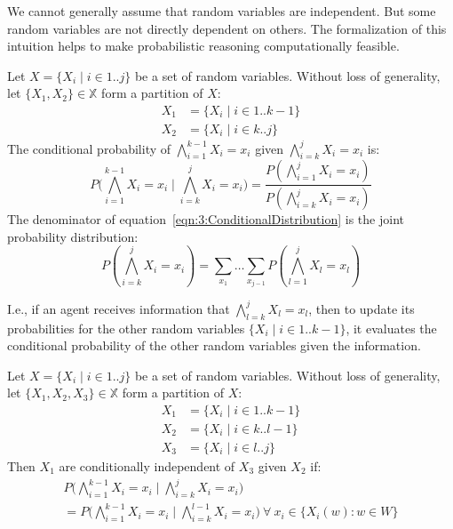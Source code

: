 We cannot generally assume that random variables are independent.
But some random variables are not directly dependent on others.
The formalization of this intuition helps to make probabilistic reasoning
computationally feasible.

\begin{dfn}
  Let $X = \{ X_i \mid i \in 1 .. j \}$ be a set of random variables.
  Without loss of generality, let $\{ X_1, X_2 \} \in \mathbb{X}$ form a
  partition of $X$:
  \begin{align*}
    X_1 & = \{ X_i \mid i \in 1 .. k - 1 \} \\
    X_2 & = \{ X_i \mid i \in k .. j \}
  \end{align*}
  The conditional probability of $\bigwedge_{i = 1}^{k - 1} X_i = x_i$
  given $\bigwedge_{i = k}^{j} X_i = x_i$ is:
  \begin{equation}
    \label{eqn:3:ConditionalDistribution}
    P \bigl( \bigwedge_{i = 1}^{k - 1} X_i = x_i \mid \bigwedge_{i = k}^{j} X_i = x_i \bigr)
    = \frac{P(\bigwedge_{i = 1}^{j} X_i = x_i)}{P(\bigwedge_{i = k}^{j} X_i = x_i)}
  \end{equation}
  The denominator of equation~\ref{eqn:3:ConditionalDistribution} is the joint
  probability distribution:
  \begin{equation}
    P(\bigwedge_{i = k}^{j} X_i = x_i)
    = \sum_{x_1} \ldots \sum_{x_{j - 1}} P(\bigwedge_{l = 1}^{j} X_l = x_l)
  \end{equation}
\end{dfn}

I.e., if an agent receives information that $\bigwedge_{l = k}^{j} X_l = x_l$,
then to update its probabilities for the other random variables
$\{ X_i \mid i \in 1 .. k - 1 \}$, it evaluates the conditional probability of
the other random variables given the information.

\begin{dfn}
  Let $X = \{ X_i \mid i \in 1 .. j \}$ be a set of random variables.
  Without loss of generality, let $\{ X_1, X_2, X_3 \} \in \mathbb{X}$ form a
  partition of $X$:
  \begin{align*}
    X_1 & = \{ X_i \mid i \in 1 .. k - 1 \} \\
    X_2 & = \{ X_i \mid i \in k .. l - 1 \} \\
    X_3 & = \{ X_i \mid i \in l .. j \}
  \end{align*}
  Then $X_1$ are conditionally independent of $X_3$ given $X_2$ if:
  \begin{multline}
    P \bigl( \bigwedge_{i = 1}^{k - 1} X_i = x_i \mid \bigwedge_{i = k}^{j} X_i = x_i \bigr) \\
    = P \bigl( \bigwedge_{i = 1}^{k - 1} X_i = x_i \mid \bigwedge_{i = k}^{l - 1} X_i = x_i \bigr)
    \ \forall\
    x_i \in \{ X_i(w) : w \in W \}
  \end{multline}
\end{dfn}

